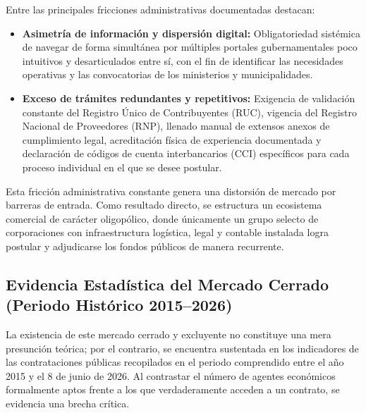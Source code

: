 \documentclass[12pt,a4paper]{article}
\begin{document}
Entre las principales fricciones administrativas documentadas destacan:
\begin{itemize}
    \item \textbf{Asimetría de información y dispersión digital:} Obligatoriedad sistémica de navegar de forma simultánea por múltiples portales gubernamentales poco intuitivos y desarticulados entre sí, con el fin de identificar las necesidades operativas y las convocatorias de los ministerios y municipalidades.
    \item \textbf{Exceso de trámites redundantes y repetitivos:} Exigencia de validación constante del Registro Único de Contribuyentes (RUC), vigencia del Registro Nacional de Proveedores (RNP), llenado manual de extensos anexos de cumplimiento legal, acreditación física de experiencia documentada y declaración de códigos de cuenta interbancarios (CCI) específicos para cada proceso individual en el que se desee postular.
\end{itemize}

Esta fricción administrativa constante genera una distorsión de mercado por barreras de entrada. Como resultado directo, se estructura un ecosistema comercial de carácter oligopólico, donde únicamente un grupo selecto de corporaciones con infraestructura logística, legal y contable instalada logra postular y adjudicarse los fondos públicos de manera recurrente.

\subsection{Evidencia Estadística del Mercado Cerrado (Periodo Histórico 2015--2026)}
La existencia de este mercado cerrado y excluyente no constituye una mera presunción teórica; por el contrario, se encuentra sustentada en los indicadores de las contrataciones públicas recopilados en el periodo comprendido entre el año 2015 y el 8 de junio de 2026. Al contrastar el número de agentes económicos formalmente aptos frente a los que verdaderamente acceden a un contrato, se evidencia una brecha crítica.
\end{document}
